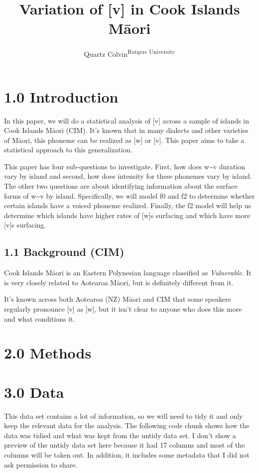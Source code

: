 \documentclass[
  ,man,floatsintext]{apa6}
\title{Variation of {[}v{]} in Cook Islands Māori}
\author{Quartz Colvin\textsuperscript{Rutgers University}}
\date{}
\affiliation{\phantom{0}}
\begin{document}
\maketitle

\section{1.0 Introduction}\label{introduction}

In this paper, we will do a statistical analysis of {[}v{]} across a sample of islands in Cook Islands Māori (CIM). It's known that in many dialects and other varieties of Māori, this phoneme can be realized as {[}w{]} or {[}v{]}. This paper aims to take a statistical approach to this generalization.

This paper has four sub-questions to investigate. First, how does w\textasciitilde v duration vary by island and second, how does intensity for these phonemes vary by island. The other two questions are about identifying information about the surface forms of w\textasciitilde v by island. Specifically, we will model f0 and f2 to determine whether certain islands have a voiced phoneme realized. Finally, the f2 model will help us determine which islands have higher rates of {[}w{]}s surfacing and which have more {[}v{]}s surfacing.

\subsection{1.1 Background (CIM)}\label{background-cim}

Cook Islands Māori is an Eastern Polynesian language classified as \emph{Vulnerable}. It is very closely related to Aotearoa Māori, but is definitely different from it.

It's known across both Aotearoa (NZ) Māori and CIM that some speakers regularly pronounce {[}v{]} as {[}w{]}, but it isn't clear to anyone who does this more and what conditions it.

\section{2.0 Methods}\label{methods}

\section{3.0 Data}\label{data}

This data set contains a lot of information, so we will need to tidy it and only keep the relevant data for the analysis. The following code chunk shows how the data was tidied and what was kept from the untidy data set. I don't show a preview of the untidy data set here because it had 17 columns and most of the columns will be taken out. In addition, it includes some metadata that I did not ask permission to share.
\end{document}
